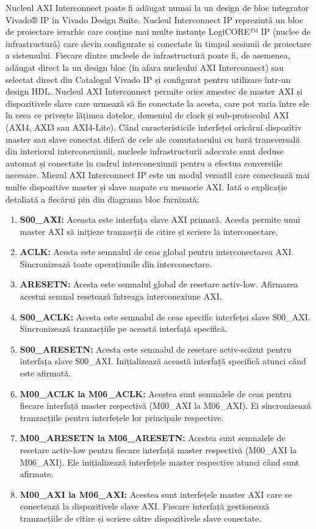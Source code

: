 \documentclass[12pt]{article}
\begin{document}
\hspace*{1cm}Nucleul AXI Interconnect poate fi adăugat numai la un design de bloc integrator Vivado® IP în Vivado Design Suite. Nucleul Interconnect IP reprezintă un bloc de proiectare ierarhic care conține mai multe instanțe LogiCORE™ IP (nuclee de infrastructură) care devin configurate și conectate în timpul sesiunii de proiectare a sistemului. Fiecare dintre nucleele de infrastructură poate fi, de asemenea, adăugat direct la un design bloc (în afara nucleului AXI Interconnect) sau selectat direct din Catalogul Vivado IP și configurat pentru utilizare într-un design HDL. Nucleul AXI Interconnect permite orice amestec de master AXI și dispozitivele slave care urmează să fie conectate la acesta, care pot varia între ele în ceea ce privește lățimea datelor, domeniul de clock și sub-protocolul AXI (AXI4, AXI3 sau AXI4-Lite). Când caracteristicile interfeței oricărui dispozitiv master sau slave conectat diferă de cele ale comutatorului cu bară transversală din interiorul interconexiunii, nucleele infrastructurii adecvate sunt deduse automat și conectate în cadrul interconexiunii pentru a efectua conversiile necesare.
\hspace*{1cm}Miezul AXI Interconnect IP este un modul versatil care conectează mai multe dispozitive master și slave mapate cu memorie AXI. Iată o explicație detaliată a fiecărui pin din diagrama bloc furnizată:
\begin{enumerate}
    \item \textbf{S00\_AXI:} Aceasta este interfața slave AXI primară. Acesta permite unui master AXI să inițieze tranzacții de citire și scriere la interconectare.
    \item \textbf{ACLK:} Acesta este semnalul de ceas global pentru interconectarea AXI. Sincronizează toate operațiunile din interconectare.
    \item \textbf{ARESETN:} Acesta este semnalul global de resetare activ-low. Afirmarea acestui semnal resetează întreaga interconexiune AXI.
    \item \textbf{S00\_ACLK:} Acesta este semnalul de ceas specific interfeței slave S00\_AXI. Sincronizează tranzacțiile pe această interfață specifică.
    \item \textbf{S00\_ARESETN:} Acesta este semnalul de resetare activ-scăzut pentru interfața slave S00\_AXI. Inițializează această interfață specifică atunci când este afirmată.
    \item \textbf{M00\_ACLK la M06\_ACLK:} Acestea sunt semnalele de ceas pentru fiecare interfață master respectivă (M00\_AXI la M06\_AXI). Ei sincronizează tranzacțiile pentru interfețele lor principale respective.
    \item \textbf{M00\_ARESETN la M06\_ARESETN:} Acestea sunt semnalele de resetare activ-low pentru fiecare interfață master respectivă (M00\_AXI la M06\_AXI). Ele inițializează interfețele master respective atunci când sunt afirmate.
    \item \textbf{M00\_AXI la M06\_AXI:} Acestea sunt interfețele master AXI care se conectează la dispozitivele slave AXI. Fiecare interfață gestionează tranzacțiile de citire și scriere către dispozitivele slave conectate.\\
\end{enumerate}
\end{document}
